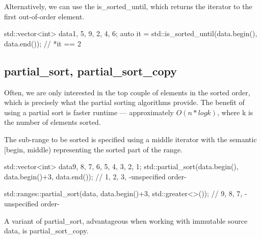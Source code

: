 Alternatively, we can use the is\_sorted\_until, which returns the iterator to the first out-of-order element.



\begin{box-note}
\begin{cppcode}
std::vector<int> data{1, 5, 9, 2, 4, 6};
auto it = std::is_sorted_until(data.begin(), data.end());
// *it == 2
\end{cppcode}
\end{box-note}

\subsection{partial\_sort, partial\_sort\_copy}

Often, we are only interested in the top couple of elements in the sorted order, which is precisely what the partial sorting algorithms provide. The benefit of using a partial sort is faster runtime — approximately $O(n*logk)$, where k is the number of elements sorted.



The sub-range to be sorted is specified using a middle iterator with the semantic [begin, middle) representing the sorted part of the range.

\begin{box-note}
\begin{cppcode}
std::vector<int> data{9, 8, 7, 6, 5, 4, 3, 2, 1};
std::partial_sort(data.begin(), data.begin()+3, data.end());
// 1, 2, 3, -unspecified order-

std::ranges::partial_sort(data, data.begin()+3, std::greater<>());
// 9, 8, 7, -unspecified order-
\end{cppcode}
\end{box-note}

A variant of partial\_sort, advantageous when working with immutable source data, is partial\_sort\_copy.



